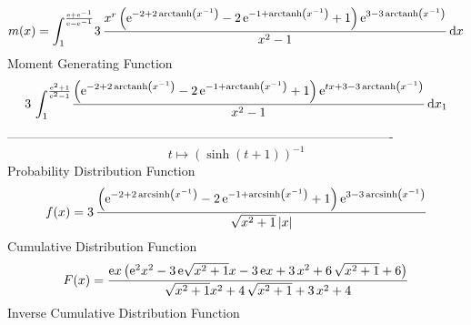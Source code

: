 \documentclass[12pt]{article}
\begin{document}
 $$ m(x) = \int_{1}^{{\frac {{\rm e}+{{\rm e}^{-1}}}{{\rm e}-{{\rm e}^{-1}}}}}\!3
\,{\frac {{x}^{r} \left( {{\rm e}^{-2+2\,{\rm arctanh} \left({x}^{-1}
\right)}}-2\,{{\rm e}^{-1+{\rm arctanh} \left({x}^{-1}\right)}}+1
 \right) {{\rm e}^{3-3\,{\rm arctanh} \left({x}^{-1}\right)}}}{{x}^{2}
-1}}\,{\rm d}x
$$ Moment Generating Function 
 $$3\,\int_{1}^{{\frac {{{\rm e}^{2}}+1}{{{\rm e}^{2}}-1}}}\!{\frac {
 \left( {{\rm e}^{-2+2\,{\rm arctanh} \left({x}^{-1}\right)}}-2\,{
{\rm e}^{-1+{\rm arctanh} \left({x}^{-1}\right)}}+1 \right) {{\rm e}^{
tx+3-3\,{\rm arctanh} \left({x}^{-1}\right)}}}{{x}^{2}-1}}\,{\rm d}x_{
{1}}
$$-------------------------------------------------------------------------------------------  \\$$t\mapsto  \left( \sinh \left( t+1 \right)  \right) ^{-1}
$$Probability Distribution Function 
$$  f(x)=3\,{\frac { \left( {{\rm e}^{-2+2\,{\rm arcsinh} \left({x}^{-1}\right)
}}-2\,{{\rm e}^{-1+{\rm arcsinh} \left({x}^{-1}\right)}}+1 \right) {
{\rm e}^{3-3\,{\rm arcsinh} \left({x}^{-1}\right)}}}{\sqrt {{x}^{2}+1}
 \left| x \right| }}
$$Cumulative Distribution Function  
 $$F(x)={\frac {{\rm e}x \left( {{\rm e}^{2}}{x}^{2}-3\,{\rm e}\sqrt {{x}^{2}+
1}x-3\,{\rm e}x+3\,{x}^{2}+6\,\sqrt {{x}^{2}+1}+6 \right) }{\sqrt {{x}
^{2}+1}{x}^{2}+4\,\sqrt {{x}^{2}+1}+3\,{x}^{2}+4}}
$$ Inverse Cumulative Distribution Function 
\end{document}
